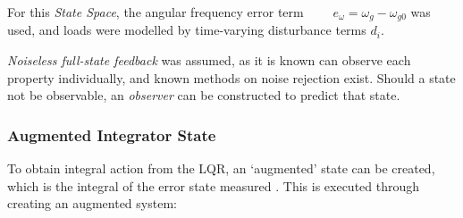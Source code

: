 %

For this \emph{State Space}, the angular frequency error term $\qquad e_{\omega} = \omega_{g} - \omega_{g0}$ was used, and loads were modelled by time-varying disturbance terms $d_i$.

\emph{Noiseless full-state feedback} was assumed, as it is known can observe each property individually, and known methods on noise rejection exist.
Should a state not be observable, an \emph{observer} can be constructed to predict that state. \cite{power:controlman}

\subsubsection{Augmented Integrator State}

To obtain integral action from the LQR, an `augmented' state can be created, which is the integral of the error state measured \cite{power:augstate}. This is executed through creating an augmented system:

